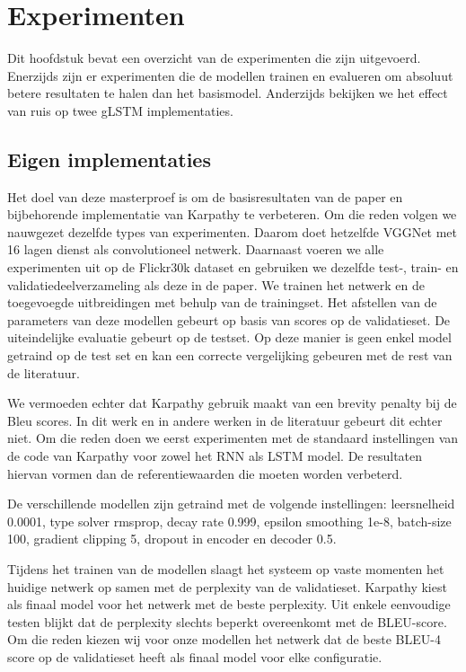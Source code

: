 \chapter{Experimenten} %
\label{cha:experimenten}
Dit hoofdstuk bevat een overzicht van de experimenten die zijn uitgevoerd. Enerzijds zijn er experimenten die de modellen trainen en evalueren om absoluut betere resultaten te halen dan het basismodel. Anderzijds bekijken we het effect van ruis op twee gLSTM implementaties.

\section{Eigen implementaties} %
\label{sec:eigen_implementaties_exp}
Het doel van deze masterproef is om de basisresultaten van de paper en bijbehorende implementatie van Karpathy\cite{Karpathy2015} te verbeteren. Om die reden volgen we nauwgezet dezelfde types van experimenten. Daarom doet hetzelfde VGGNet met 16 lagen dienst als convolutioneel netwerk. Daarnaast voeren we alle experimenten uit op de Flickr30k dataset en gebruiken we dezelfde test-, train- en validatiedeelverzameling als deze in de paper. We trainen het netwerk en de toegevoegde uitbreidingen met behulp van de trainingset. Het afstellen van de parameters van deze modellen gebeurt op basis van scores op de validatieset. De uiteindelijke evaluatie gebeurt op de testset. Op deze manier is geen enkel model getraind op de test set en kan een correcte vergelijking gebeuren met de rest van de literatuur.

We vermoeden echter dat Karpathy gebruik maakt van een brevity penalty  bij de Bleu scores. In dit werk en in andere werken in de literatuur gebeurt dit echter niet. Om die reden doen we eerst experimenten met de standaard instellingen van de code van Karpathy voor zowel het RNN als LSTM model. De resultaten hiervan vormen dan de referentiewaarden die moeten worden verbeterd. 

De verschillende modellen zijn getraind met de volgende instellingen: leersnelheid 0.0001, type solver rmsprop, decay rate 0.999, epsilon smoothing 1e-8, batch-size 100, gradient clipping 5, dropout in encoder en decoder 0.5. 

Tijdens het trainen van de modellen slaagt het systeem op vaste momenten het huidige netwerk op samen met de perplexity van de validatieset. Karpathy kiest als finaal model voor het netwerk met de beste perplexity. Uit enkele eenvoudige testen blijkt dat de perplexity slechts beperkt overeenkomt met de BLEU-score. Om die reden kiezen wij voor onze modellen het netwerk dat de beste BLEU-4 score op de validatieset heeft als finaal model voor elke configuratie.

